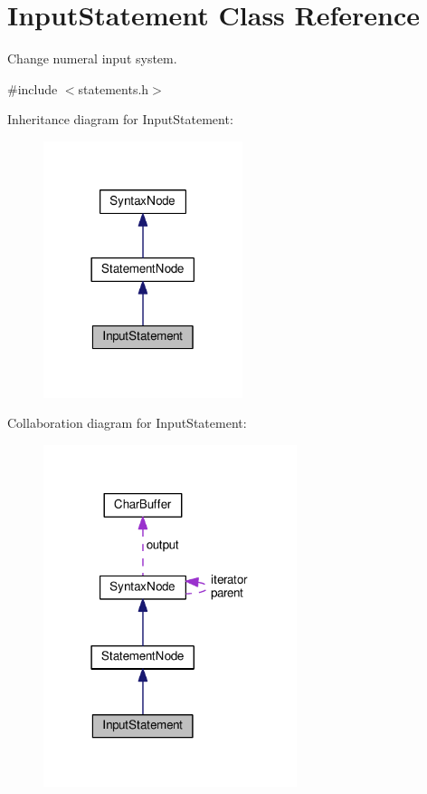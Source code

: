 \hypertarget{classInputStatement}{}\section{Input\+Statement Class Reference}
\label{classInputStatement}


Change numeral input system.  




{\ttfamily \#include $<$statements.\+h$>$}



Inheritance diagram for Input\+Statement\+:
\nopagebreak
\begin{figure}[H]
\begin{center}
\leavevmode
\includegraphics[width=165pt]{de/d6b/classInputStatement__inherit__graph}
\end{center}
\end{figure}


Collaboration diagram for Input\+Statement\+:
\nopagebreak
\begin{figure}[H]
\begin{center}
\leavevmode
\includegraphics[width=210pt]{d1/d70/classInputStatement__coll__graph}
\end{center}
\end{figure}
